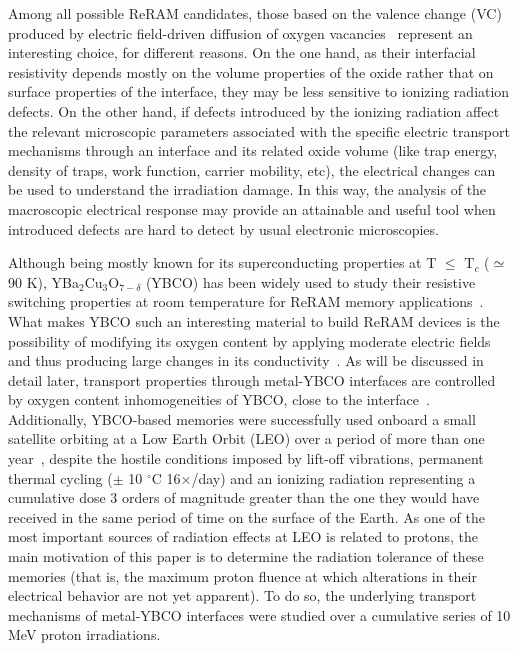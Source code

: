 \documentclass[square,aip,preprint,showkeys,superscriptaddress]{revtex4}
\begin{document}
Among all possible ReRAM candidates, those based on the valence change (VC) produced by electric field-driven diffusion of oxygen vacancies~\cite{Waser09a,Rozenberg10} represent an interesting choice, for different reasons. On the one hand, as their interfacial resistivity depends mostly on the volume properties of the oxide rather that on surface properties of the interface, they may be less sensitive to ionizing radiation defects. On the other hand, if defects introduced by the ionizing radiation affect the relevant microscopic parameters associated with the specific electric transport mechanisms through an interface and its related oxide volume (like trap energy, density of traps, work function, carrier mobility, etc), the electrical changes can be used to understand the irradiation damage. In this way, the analysis of the macroscopic electrical response may provide an attainable and useful tool when introduced defects are hard to detect by usual electronic microscopies.

Although being mostly known for its superconducting properties at T $\leq$ T$_c$ ($\simeq$ 90 K),  YBa$_2$Cu$_3$O$_{7-\delta}$ (YBCO) has been widely used to study their resistive switching properties at room temperature  for ReRAM memory applications~\cite{Acha09a,Acha09b,Placenik10,Acha11,Lanosa20}. What makes YBCO such an interesting material to build ReRAM devices is the possibility of modifying its oxygen content by applying moderate electric fields and thus producing large changes in its conductivity~\cite{Moeckly93,Schulman13,Palau18}. As will be discussed in detail later, transport properties through metal-YBCO interfaces are controlled by oxygen content inhomogeneities of YBCO, close to the interface~\cite{Schulman12,Placenik12,Schulman15,Waskiewicz15,Truchly16,Waskiewicz18,Tulina18}.  Additionally, YBCO-based memories were successfully used onboard a small satellite orbiting at a Low Earth Orbit (LEO) over a period of more than one year~\cite{Acha20}, despite the hostile conditions imposed by lift-off vibrations, permanent thermal cycling ($\pm$ 10 $^{\circ}$C 16$\times$/day) and an ionizing radiation representing a cumulative dose 3 orders of magnitude greater than the one they would have received in the same period of time on the surface of the Earth. As one of the most important sources of radiation effects at LEO is related to protons, the main motivation of this paper is to determine the radiation tolerance of these memories (that is, the maximum proton fluence at which alterations in their electrical behavior are not yet apparent). To do so, the underlying transport mechanisms of metal-YBCO interfaces were studied over a cumulative series of 10 MeV proton irradiations.   
\end{document}
